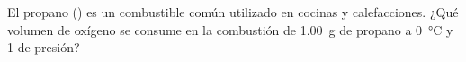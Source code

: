 El propano () es un combustible común utilizado en cocinas y calefacciones. ¿Qué volumen de oxígeno se consume en la combustión de \SI{1,00}{\gram} de propano a \SI{0}{\celsius} y \SI{1}{\atm} de presión?
